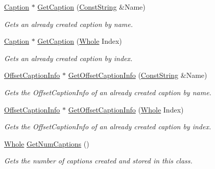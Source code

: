 \begin{DoxyCompactItemize}
\hyperlink{classphys_1_1UI_1_1Caption}{Caption} $\ast$ \hyperlink{classphys_1_1UI_1_1Window_acfc2669ecac2824bfa7cc53eb724d191}{GetCaption} (\hyperlink{namespacephys_a5ce5049f8b4bf88d6413c47b504ebb31}{ConstString} \&Name)
\begin{DoxyCompactList}\small\item\em Gets an already created caption by name. \item\end{DoxyCompactList}\item 
\hyperlink{classphys_1_1UI_1_1Caption}{Caption} $\ast$ \hyperlink{classphys_1_1UI_1_1Window_a06186f11ba6909d5271a86b317290adf}{GetCaption} (\hyperlink{namespacephys_a460f6bc24c8dd347b05e0366ae34f34a}{Whole} Index)
\begin{DoxyCompactList}\small\item\em Gets an already created caption by index. \item\end{DoxyCompactList}\item 
\hyperlink{structphys_1_1UI_1_1ResizingInfo}{OffsetCaptionInfo} $\ast$ \hyperlink{classphys_1_1UI_1_1Window_afa081532c017f5e8c4f04bfd2df207b6}{GetOffsetCaptionInfo} (\hyperlink{namespacephys_a5ce5049f8b4bf88d6413c47b504ebb31}{ConstString} \&Name)
\begin{DoxyCompactList}\small\item\em Gets the OffsetCaptionInfo of an already created caption by name. \item\end{DoxyCompactList}\item 
\hyperlink{structphys_1_1UI_1_1ResizingInfo}{OffsetCaptionInfo} $\ast$ \hyperlink{classphys_1_1UI_1_1Window_a25dbba29f002817646d4fafd8e2cc905}{GetOffsetCaptionInfo} (\hyperlink{namespacephys_a460f6bc24c8dd347b05e0366ae34f34a}{Whole} Index)
\begin{DoxyCompactList}\small\item\em Gets the OffsetCaptionInfo of an already created caption by index. \item\end{DoxyCompactList}\item 
\hyperlink{namespacephys_a460f6bc24c8dd347b05e0366ae34f34a}{Whole} \hyperlink{classphys_1_1UI_1_1Window_a125d78e98b47a4d93f6414545fd2374c}{GetNumCaptions} ()
\begin{DoxyCompactList}\small\item\em Gets the number of captions created and stored in this class. \item\end{DoxyCompactList}\item 

\end{DoxyCompactItemize}
